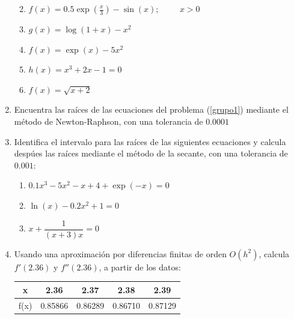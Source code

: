 \documentclass[11pt]{article}
\renewcommand{\arraystretch}{1.5}
\begin{document}
\begin{enumerate}
\begin{enumerate}
\renewcommand{\arraystretch}{1.5}
\item $f(x) = 0.5\exp(\frac{x}{3})- \sin(x); \hspace{1cm} x > 0$
\item $g(x) = \log(1 + x) - x^{2}$
\item $f(x) = \exp(x) - 5x^{2}$
\item $h(x) = x^{3} + 2x - 1 = 0$
\item $f(x) = \sqrt{x+2}$
\end{enumerate}
\item Encuentra las raíces de las ecuaciones del problema (\ref{grupo1}) mediante el método de Newton-Raphson, con una tolerancia de $0.0001$
\item Identifica el intervalo para las raíces de las siguientes ecuaciones y calcula despúes las raíces mediante el método de la secante, con una tolerancia de $0.001$:
\begin{enumerate}
\item $0.1 x^{3} - 5 x^{2} - x + 4 + \exp(-x) = 0 $
\item $\ln(x) -0.2 x^{2} + 1 = 0$
\item $x + \dfrac{1}{(x+3)x}= 0$
\end{enumerate}
\item Usando una aproximación por diferencias finitas de orden $O(h^{2})$, calcula $f'(2.36)$ y $f''(2.36)$, a partir de los datos:
\begin{center}
\begin{tabular}{c | c | c | c | c}
x & 2.36 & 2.37 & 2.38 & 2.39 \\ \hline
f(x) & 0.85866 & 0.86289 & 0.86710 & 0.87129

\end{tabular}
\end{center}
\end{enumerate}
\end{document}

